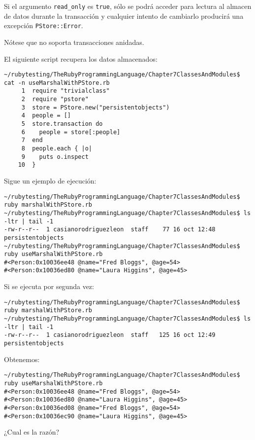 Si el argumento \verb|read_only| es \verb|true|, 
sólo se podrá acceder para lectura al almacen de datos durante 
la transacción y cualquier intento de 
cambiarlo producirá una excepción \verb|PStore::Error|.

Nótese que  no soporta transacciones anidadas.

El siguiente script recupera los datos almacenados:

\begin{verbatim}
~/rubytesting/TheRubyProgrammingLanguage/Chapter7ClassesAndModules$ cat -n useMarshalWithPStore.rb
     1  require "trivialclass"
     2  require "pstore"
     3  store = PStore.new("persistentobjects")
     4  people = []
     5  store.transaction do
     6    people = store[:people]
     7  end
     8  people.each { |o|
     9    puts o.inspect
    10  }
\end{verbatim}

Sigue un ejemplo de ejecución:


\begin{verbatim}
~/rubytesting/TheRubyProgrammingLanguage/Chapter7ClassesAndModules$ ruby marshalWithPStore.rb 
~/rubytesting/TheRubyProgrammingLanguage/Chapter7ClassesAndModules$ ls -ltr | tail -1
-rw-r--r--  1 casianorodriguezleon  staff    77 16 oct 12:48 persistentobjects
~/rubytesting/TheRubyProgrammingLanguage/Chapter7ClassesAndModules$ ruby useMarshalWithPStore.rb 
#<Person:0x10036ee48 @name="Fred Bloggs", @age=54>
#<Person:0x10036ed80 @name="Laura Higgins", @age=45>
\end{verbatim}

\begin{exercise}
Si se ejecuta por segunda vez:
\begin{verbatim}
~/rubytesting/TheRubyProgrammingLanguage/Chapter7ClassesAndModules$ ruby marshalWithPStore.rb 
~/rubytesting/TheRubyProgrammingLanguage/Chapter7ClassesAndModules$ ls -ltr | tail -1
-rw-r--r--  1 casianorodriguezleon  staff   125 16 oct 12:49 persistentobjects
\end{verbatim}
Obtenemos:
\begin{verbatim}
~/rubytesting/TheRubyProgrammingLanguage/Chapter7ClassesAndModules$ ruby useMarshalWithPStore.rb 
#<Person:0x10036ee48 @name="Fred Bloggs", @age=54>
#<Person:0x10036ed80 @name="Laura Higgins", @age=45>
#<Person:0x10036ed08 @name="Fred Bloggs", @age=54>
#<Person:0x10036ec90 @name="Laura Higgins", @age=45>
\end{verbatim}
¿Cual es la razón?
\end{exercise}

